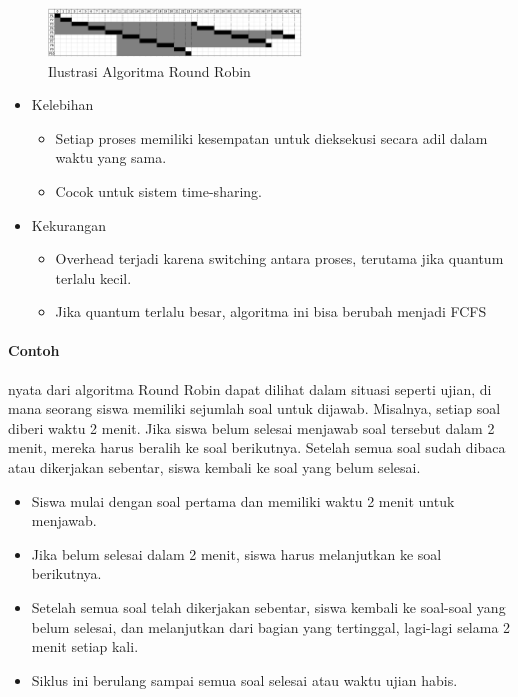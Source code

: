 \documentclass[12pt]{article}
\begin{document}
\begin{figure}[h]
\centering
\includegraphics[width=0.6\textwidth]{asset/Kelompok5_Round Robbin.png}
\caption{Ilustrasi Algoritma Round Robin}
\label{fig:roundrobin}
\end{figure}

\begin{itemize}
\item Kelebihan
\begin{itemize}
    \item Setiap proses memiliki kesempatan untuk dieksekusi secara adil dalam waktu yang sama.
    \item Cocok untuk sistem time-sharing.
\end{itemize}
\end{itemize}

\begin{itemize}
\item Kekurangan
\begin{itemize}
    \item Overhead terjadi karena switching antara proses, terutama jika quantum terlalu kecil.
    \item Jika quantum terlalu besar, algoritma ini bisa berubah menjadi FCFS
\end{itemize}
\end{itemize}

\paragraph{Contoh}
 nyata dari algoritma Round Robin dapat dilihat dalam situasi seperti ujian, di mana seorang siswa memiliki sejumlah soal untuk dijawab. Misalnya, setiap soal diberi waktu 2 menit. Jika siswa belum selesai menjawab soal tersebut dalam 2 menit, mereka harus beralih ke soal berikutnya. Setelah semua soal sudah dibaca atau dikerjakan sebentar, siswa kembali ke soal yang belum selesai.
\begin{itemize}
    \item Siswa mulai dengan soal pertama dan memiliki waktu 2 menit untuk menjawab.
    \item Jika belum selesai dalam 2 menit, siswa harus melanjutkan ke soal berikutnya.
    \item Setelah semua soal telah dikerjakan sebentar, siswa kembali ke soal-soal yang belum selesai, dan melanjutkan dari bagian yang tertinggal, lagi-lagi selama 2 menit setiap kali.
    \item Siklus ini berulang sampai semua soal selesai atau waktu ujian habis.
\end{itemize}
\end{document}
